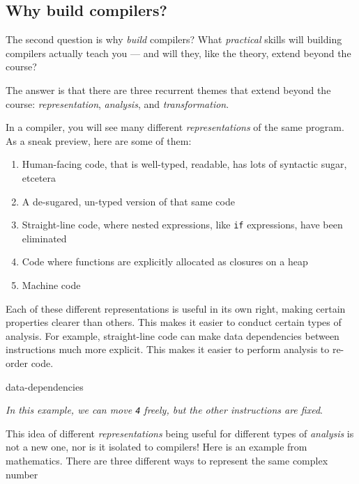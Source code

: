 \subsection{Why build compilers?}
The second question is why \emph{build} compilers? What \emph{practical} skills will building compilers actually teach you --- and will they, like the theory, extend beyond the course?

The answer is that there are three recurrent themes that extend beyond the course: \emph{representation}, \emph{analysis}, and \emph{transformation}. 

In a compiler, you will see many different \textit{representations} of the same program. As a sneak preview, here are some of them:

\begin{enumerate}
    \item Human-facing code, that is well-typed, readable, has lots of syntactic sugar, etcetera
    \item A de-sugared, un-typed version of that same code
    \item Straight-line code, where nested expressions, like \texttt{if} expressions, have been eliminated
    \item Code where functions are explicitly allocated as closures on a heap
    \item Machine code
\end{enumerate}

Each of these different representations is useful in its own right, making certain properties clearer than others. This makes it easier to conduct certain types of analysis. For example, straight-line code can make data dependencies between instructions much more explicit. This makes it easier to perform analysis to re-order code.

\begin{center}
    {data-dependencies}
\end{center}

\textit{In this example, we can move \textit{\texttt{4}} freely, but the other instructions are fixed}.

This idea of different \textit{representations} being useful for different types of \textit{analysis} is not a new one, nor is it isolated to compilers! Here is an example from mathematics. There are three different ways to represent the same complex number

